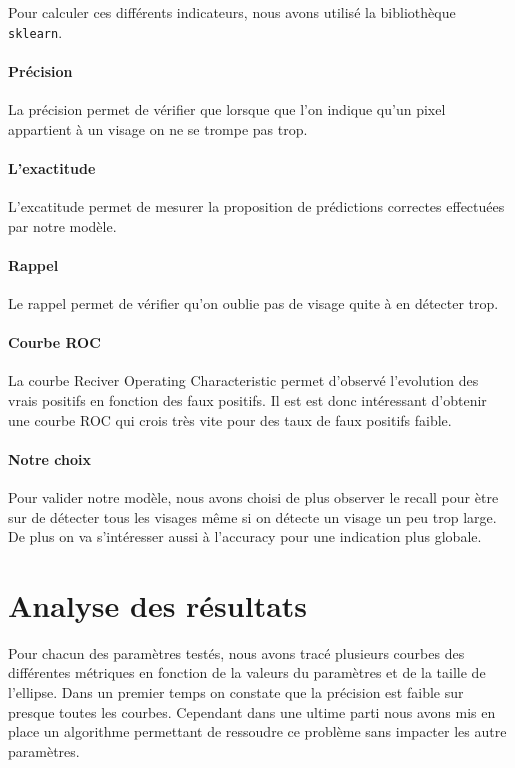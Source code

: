 \documentclass[a4paper,12pt, openany]{book}
\theoremstyle{break}
\begin{document}
Pour calculer ces différents indicateurs, nous avons utilisé la bibliothèque \texttt{sklearn}.

\paragraph{Précision}
La précision permet de vérifier que lorsque que l'on indique qu'un pixel appartient à un visage on ne se trompe pas trop.

\paragraph{L'exactitude}
L'excatitude permet de mesurer la proposition de prédictions correctes effectuées par notre modèle.

\paragraph{Rappel}
Le rappel permet de vérifier qu'on oublie pas de visage quite à en détecter trop.

\paragraph{Courbe ROC}
La courbe Reciver Operating Characteristic permet d'observé l'evolution des vrais positifs en fonction des faux positifs. Il est est donc intéressant d'obtenir une courbe ROC qui crois très vite pour des taux de faux positifs faible.

\paragraph{Notre choix}
Pour valider notre modèle, nous avons choisi de plus observer le recall pour ètre sur de détecter tous les visages même si on détecte un visage un peu trop large. De plus on va s'intéresser aussi à l'accuracy pour une indication plus globale.

\section{Analyse des résultats}
Pour chacun des paramètres testés, nous avons tracé plusieurs courbes des différentes métriques en fonction de la valeurs du paramètres et de la taille de l'ellipse.
Dans un premier temps on constate que la précision est faible sur presque toutes les courbes. Cependant dans une ultime parti nous avons mis en place un algorithme permettant de ressoudre ce problème sans impacter les autre paramètres.
\end{document}
